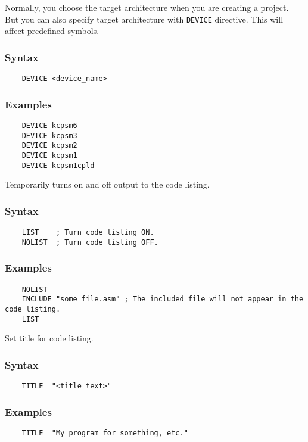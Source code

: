 \clearpage
{}
    Normally, you choose the target architecture when you are creating a project. But you can also specify target architecture with \texttt{DEVICE} directive. This will affect predefined symbols.

    \subsubsection{Syntax}
        \verb'    DEVICE <device_name>'

    \subsubsection{Examples}
        \verb'    DEVICE kcpsm6'\\
        \verb'    DEVICE kcpsm3'\\
        \verb'    DEVICE kcpsm2'\\
        \verb'    DEVICE kcpsm1'\\
        \verb'    DEVICE kcpsm1cpld'

    Temporarily turns on and off output to the code listing.

    \subsubsection{Syntax}
        \verb'    LIST    ; Turn code listing ON.'\\
        \verb'    NOLIST  ; Turn code listing OFF.'

    \subsubsection{Examples}
        \verb'    NOLIST'\\
        \verb'    INCLUDE "some_file.asm" ; The included file will not appear in the code listing.'\\
        \verb'    LIST'

\clearpage
{}
    Set title for code listing.

    \subsubsection{Syntax}
        \verb'    TITLE  "<title text>"'

    \subsubsection{Examples}
        \verb'    TITLE  "My program for something, etc."'

